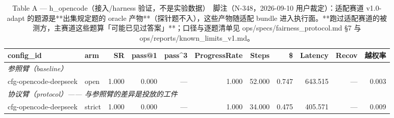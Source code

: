 \begin{table}[t]
\centering
\caption{Table A — h\_opencode（接入/harness 验证，不是实验数据）　脚注（N-348，2026-09-10 用户裁定）：适配赛道 v1.0-adapt 的题源是**出集规定题的 oracle 产物**（探针题不入），这些产物随适配 bundle 进入执行面。**跑过适配赛道的被测方，主赛道这些题算「可能已见过答案」**；口径与逐题清单见 ops/specs/fairness\_protocol.md §7 与 ops/reports/known\_limits\_v1.md。}
\label{tab:a-h_opencode}
\begin{tabular}{llrrrrrrrrr}
\toprule
config\_id & arm & SR & pass@1 & pass\^{}3 & ProgressRate & Steps & \$ & Latency & Recov & 越权率 \\
\midrule
\multicolumn{11}{l}{\textit{参照臂（baseline）}} \\
cfg-opencode-deepseek & open & 1.000 & 0.000 & --- & 1.000 & 52.000 & 0.747 & 643.515 & --- & 0.003 \\
\midrule
\multicolumn{11}{l}{\textit{协议臂（protocol）—— 与参照臂的差异是投放的工件}} \\
cfg-opencode-deepseek & strict & 1.000 & 0.000 & --- & 1.000 & 34.000 & 0.475 & 405.571 & --- & 0.009 \\
\bottomrule
\end{tabular}
\end{table}

